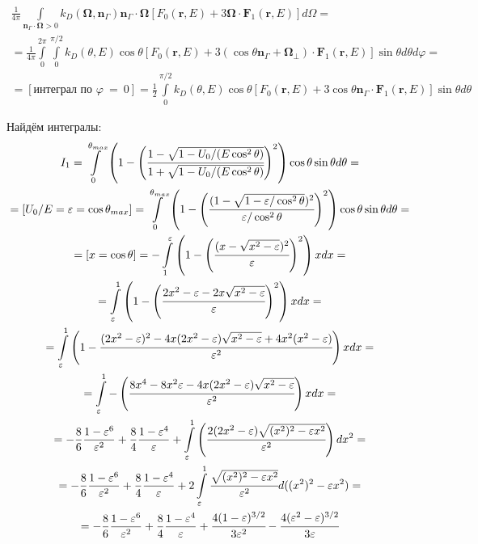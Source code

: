 \documentclass[a4paper,12pt]{article} %
\renewcommand{\vec}[1]{\bm{#1}}
\newcommand{\eps}{\varepsilon}
\renewcommand{\phi}{\varphi}
\begin{document}
\begin{equation}
\begin{gathered}
	\frac{1}{4\pi} \int\limits_{\vec{n}_\Gamma \cdot \vec{\Omega}>0} k_D(\vec{\Omega}, \vec{n}_\Gamma) \vec{n}_\Gamma \cdot \vec{\Omega} [F_0(\vec{r}, E) + 3\vec{\Omega}\cdot\vec{F}_1(\vec{r}, E)]d\Omega = \\
	=
	\frac{1}{4\pi} 
	\int\limits_{0}^{2\pi}
	\int\limits_{0}^{\pi/2}
	 k_D(\theta, E) \cos \theta [F_0(\vec{r}, E) + 3(\cos \theta \vec{n}_\Gamma + \vec{\Omega}_\perp)\cdot \vec{F}_1(\vec{r}, E)]
	 \sin \theta d\theta d\phi = \\ 
	 =
	 [\text{интеграл по }\phi~=~0] =
	 \frac{1}{2}
	 \int\limits_{0}^{\pi/2}
	 k_D(\theta, E) \cos \theta [F_0(\vec{r}, E) + 3 \cos \theta \vec{n}_\Gamma \cdot \vec{F}_1(\vec{r}, E)]
	 \sin \theta d\theta
\end{gathered}
\end{equation}

Найдём интегралы:
\begin{equation}
\begin{gathered}
	I_1 = 
	\int\limits_{0}^{\theta_{max}}
	\left(1 - \Bigg(\cfrac{1 - \sqrt{1 - U_0/(E  \cos^2 \theta)}}{1 + \sqrt{1 - U_0/(E  \cos^2 \theta)}}\Bigg)^2\right) \cos \theta \sin \theta d\theta = \\
	= [U_0/E = \eps = \cos \theta_{max}] =
	\int\limits_{0}^{\theta_{max}}
	\left(1 - \Bigg(\cfrac{(1 - \sqrt{1 - \eps/\cos^2 \theta})^2}{\eps/ \cos^2 \theta}\Bigg)^2\right) \cos \theta \sin \theta d\theta = \\
	= [x = \cos \theta] =
	- \int\limits_{1}^{\eps}
	\left(1 - \Bigg(\cfrac{(x - \sqrt{x^2 - \eps})^2}{\eps}\Bigg)^2\right) x dx = \\
	=
	\int\limits_{\eps}^{1}
	\left(1 - \Bigg(\cfrac{2 x^2 - \eps - 2 x \sqrt{x^2 - \eps} }{\eps}\Bigg)^2\right) x dx = \\
	=
	\int\limits_{\eps}^{1}
	\left(1 - \cfrac{(2 x^2 - \eps)^2 - 4 x (2 x^2 - \eps) \sqrt{x^2 - \eps} + 4x^2(x^2 - \eps) }{\eps^2}\right) x dx = \\
	=
	\int\limits_{\eps}^{1}
	-\left(\cfrac{8x^4 - 8 x^2 \eps - 4 x (2 x^2 - \eps) \sqrt{x^2 - \eps}}{\eps^2}\right) x dx
	= \\ =
	- \frac{8}{6} \frac{1 - \eps^6}{\eps^2} 
	+ \frac{8}{4} \frac{1 - \eps^4}{\eps}
	+ \int\limits_{\eps}^{1}
	\left(\cfrac{2 (2 x^2 - \eps) \sqrt{(x^2)^2 - \eps x^2}}{\eps^2}\right) dx^2 = \\ =
	- \frac{8}{6} \frac{1 - \eps^6}{\eps^2} 
	+ \frac{8}{4} \frac{1 - \eps^4}{\eps}
	+ 2 \int\limits_{\eps}^{1}
	\cfrac{\sqrt{(x^2)^2 - \eps x^2}}{\eps^2} d((x^2)^2 - \eps x^2) = \\ =
	- \frac{8}{6} \frac{1 - \eps^6}{\eps^2} 
	+ \frac{8}{4} \frac{1 - \eps^4}{\eps}
	+ \cfrac{4 (1 - \eps)^{3/2}}{ 3 \eps^2}
	- \cfrac{4 (\eps^2- \eps)^{3/2}}{ 3 \eps}
\end{gathered}
\end{equation}
\end{document}
